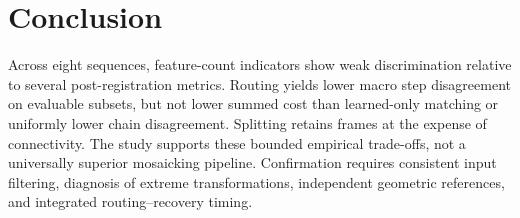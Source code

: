 \documentclass[conference]{IEEEtran}
\begin{document}
\section{Conclusion}
\label{sec:conclusion}

Across eight sequences, feature-count indicators show weak discrimination relative to several post-registration metrics. Routing yields lower macro step disagreement on evaluable subsets, but not lower summed cost than learned-only matching or uniformly lower chain disagreement. Splitting retains frames at the expense of connectivity. The study supports these bounded empirical trade-offs, not a universally superior mosaicking pipeline. Confirmation requires consistent input filtering, diagnosis of extreme transformations, independent geometric references, and integrated routing--recovery timing.



\end{document}
